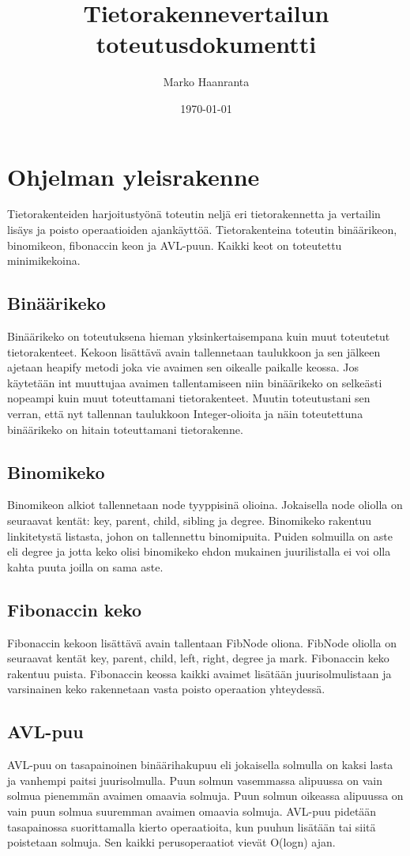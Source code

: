 \documentclass[11pt,a4paper]{article}
\author{Marko Haanranta}
\date{\today}
\title{Tietorakennevertailun toteutusdokumentti}
\begin{document}
\maketitle
\section{Ohjelman yleisrakenne}
Tietorakenteiden harjoitustyönä toteutin neljä eri tietorakennetta ja vertailin lisäys ja poisto operaatioiden ajankäyttöä. Tietorakenteina toteutin binäärikeon, binomikeon, fibonaccin keon ja AVL-puun. Kaikki keot on toteutettu minimikekoina.
\subsection{Binäärikeko}
Binäärikeko on toteutuksena hieman yksinkertaisempana kuin muut toteutetut tietorakenteet. Kekoon lisättävä avain tallennetaan taulukkoon ja sen jälkeen ajetaan heapify metodi joka vie avaimen sen oikealle paikalle keossa. Jos käytetään int muuttujaa avaimen tallentamiseen niin binäärikeko on selkeästi nopeampi kuin muut toteuttamani tietorakenteet. Muutin toteutustani sen verran, että nyt tallennan taulukkoon Integer-olioita ja näin toteutettuna binäärikeko on hitain toteuttamani tietorakenne. 
\subsection{Binomikeko}
Binomikeon alkiot tallennetaan node tyyppisinä olioina. Jokaisella node oliolla on seuraavat kentät: key, parent, child, sibling ja degree. Binomikeko rakentuu linkitetystä listasta, johon on tallennettu binomipuita. Puiden solmuilla on aste eli degree ja jotta keko olisi binomikeko ehdon mukainen juurilistalla ei voi olla kahta puuta joilla on sama aste. 
\subsection{Fibonaccin keko}
Fibonaccin kekoon lisättävä avain tallentaan FibNode oliona. FibNode oliolla on seuraavat kentät key, parent, child, left, right, degree ja mark. Fibonaccin keko rakentuu puista. Fibonaccin keossa kaikki avaimet lisätään juurisolmulistaan ja varsinainen keko rakennetaan vasta poisto operaation yhteydessä.
\subsection{AVL-puu}
AVL-puu on tasapainoinen binäärihakupuu eli jokaisella solmulla on kaksi lasta ja vanhempi paitsi juurisolmulla. Puun solmun vasemmassa alipuussa on vain solmua pienemmän avaimen omaavia solmuja. Puun solmun oikeassa alipuussa on vain puun solmua suuremman avaimen omaavia solmuja. AVL-puu pidetään tasapainossa suorittamalla kierto operaatioita, kun puuhun lisätään tai siitä poistetaan solmuja. Sen kaikki perusoperaatiot vievät O(logn) ajan. 
\end{document}
